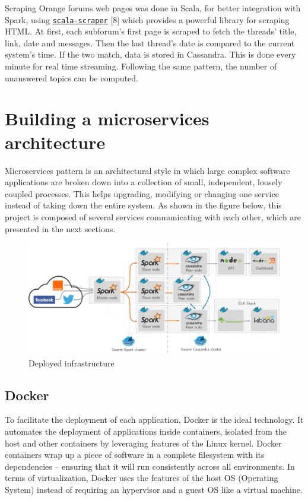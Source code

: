 \documentclass[11pt]{article}
\begin{document}
Scraping \textsf{Orange} forums web pages was done in \textsf{Scala}, for better integration with \textsf{Spark}, using \href{https://github.com/ruippeixotog/scala-scraper}{\texttt{scala-scraper}} [8] which provides a powerful library for scraping \textsf{HTML}. At first, each subforum's first page is scraped to fetch the threads' title, link, date and messages. Then the last thread's date is compared to the current system's time. If the two match, data is stored in \textsf{Cassandra}. This is done every minute for real time streaming. Following the same pattern, the number of unanswered topics can be computed. 

\section{Building a microservices architecture}


Microservices pattern is an architectural style in which large complex software applications are broken down into a collection of small, independent, loosely coupled processes. This helps upgrading, modifying or changing one service instead of taking down the entire system. As shown in the figure below, this project is composed of several services communicating with each other, which are presented in the next sections.

\begin{figure}[h!]
    \centering
    \includegraphics[scale=0.15]{img/archi.png}
    \caption{Deployed infrastructure}
    \label{infra}
\end{figure}

\subsection{Docker}

To facilitate the deployment of each application, \textsf{Docker} is the ideal technology. It automates the deployment of applications inside containers, isolated from the host and other containers by leveraging features of the \textsf{Linux} kernel. \textsf{Docker} containers wrap up a piece of software in a complete filesystem with its dependencies – ensuring that it will run consistently across all environments. In terms of virtualization, \textsf{Docker} uses the features of the host OS (Operating System) instead of requiring an hypervisor and a guest OS like a virtual machine.
\end{document}
